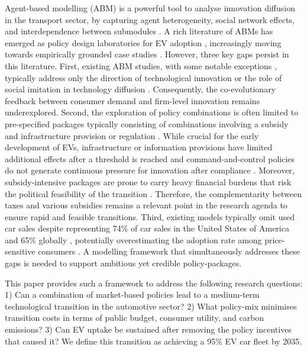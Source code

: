 \documentclass[12pt]{article}
\begin{document}
Agent-based modelling (ABM) is a powerful tool to analyse innovation diffusion in the transport sector, by capturing agent heterogeneity, social network effects, and interdependence between submodules \citep{Kiesling2012,Zhang2017Empirical}. A rich literature of ABMs has emerged as policy design laboratories for EV adoption \citep{Fadiran2020Review, Maybury2022ReviewEV,mehdizadeh2022systematic,domarchi2023electric}, increasingly moving towards empirically grounded case studies  \citep{Zhang2017Empirical,ledna2022support,xu2025influence,guven2026assessing}. However, three key gaps persist in this literature. First, existing ABM studies, with some notable exceptions \citep{dijk2013incorporating}, typically address only the direction of technological innovation \citep{windrum2009consumer,sun2019effects} or the role of social imitation in technology diffusion \citep{mccoy2014consumer,Silvia2016EVABM,li2019evolutionary,FENG2019196,he2020integration,ning2020incorporating,lee2021evaluating,zhang2022market}. Consequently, the co-evolutionary feedback between consumer demand and firm-level innovation remains underexplored. Second, the exploration of policy combinations is often limited to pre-specified packages typically consisting of combinations involving a subsidy and infrastructure provision or regulation \citep{greene2014public,Broadbent2022Accelerating,abas2024modeling,moralejo_pinas_electric_2025,cannavacciuolo_agent-based_2025,guven2026assessing,yang_impacts_2026}. While crucial for the early development of EVs, infrastructure or information provisions have limited additional effects after a threshold is reached \citep{springel_network_2021} and command-and-control policies do not generate continuous pressure for innovation after compliance \citep{Gebhardt2026}. Moreover, subsidy-intensive packages are prone to carry heavy financial burdens that risk the political feasibility of the transition \citep{Sheldon2022Evaluating,Shang2024Subsidy}. Therefore, the complementarity between taxes and various subsidies remains a relevant point in the research agenda to ensure rapid and feasible transitions. Third, existing models typically omit used car sales despite representing 74\% of car sales in the United States of America and 65\% globally \citep{360ResearchReports2026UsedCars}, potentially overestimating the adoption rate among price-sensitive consumers \citep{Muehlegger2018Understanding}. A modelling framework that simultaneously addresses these gaps is needed to support ambitious yet credible policy-packages.

This paper provides such a framework to address the following research questions: 1) Can a combination of market-based policies lead to a medium-term technological transition in the automotive sector? 2) What policy-mix minimises transition costs in terms of public budget, consumer utility, and carbon emissions? 3) Can EV uptake be sustained after removing the policy incentives that caused it? We define this transition as achieving a 95\% EV car fleet by 2035. 
\end{document}
